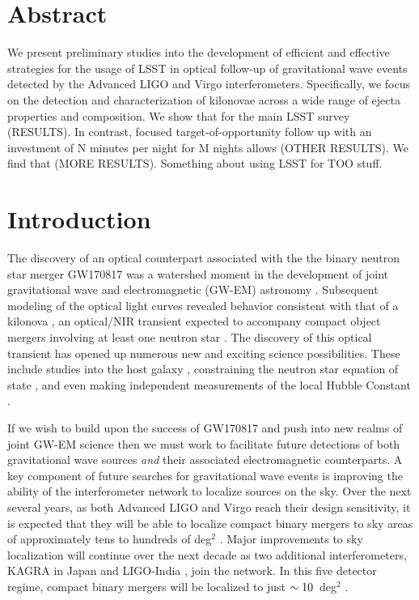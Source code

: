 \section*{Abstract}
We present preliminary studies into the development of efficient and effective strategies for the usage of LSST in optical follow-up of gravitational wave events detected by the Advanced LIGO and Virgo interferometers. Specifically, we focus on the detection and characterization of kilonovae across a wide range of ejecta properties and composition. We show that for the main LSST survey (RESULTS). In contrast, focused target-of-opportunity follow up with an investment of N minutes per night for M nights allows (OTHER RESULTS). We find that (MORE RESULTS). Something about using LSST for TOO stuff.

\clearpage
\section{Introduction}
\label{sec:ch6_intro}
The discovery of an optical counterpart associated with the the binary neutron star merger GW170817 was a watershed moment in the development of joint gravitational wave and electromagnetic (GW-EM) astronomy \citep{LIGOGW170817,LIGOMMAPaper,Arcavi+17,Coulter+17,GW170817DECam,Valenti+17}. Subsequent modeling of the optical light curves revealed behavior consistent with that of a kilonova \citep{Cowp+17,Kilpatrick+17,Tanaka+17,Villar+17b, Tanaka+18}, an optical/NIR transient expected to accompany compact object mergers involving at least one neutron star \citep[for a review see e.g.,][]{Metzger2017}. The discovery of this optical transient has opened up numerous new and exciting science possibilities. These include studies into the host galaxy \citep[NGC4993, see e.g.,][]{Blanchard+17,Cantiello+18}, constraining the neutron star equation of state \citep[see e.g.,][]{Radice+18}, and even making independent measurements of the local Hubble Constant \citep[H$_0$, see e.g.,][]{LIGOH0,Guidorzi+17}.

If we wish to build upon the success of GW170817 and push into new realms of joint GW-EM science then we must work to facilitate future detections of both gravitational wave sources {\em and} their associated electromagnetic counterparts. A key component of future searches for gravitational wave events is improving the ability of the interferometer network to localize sources on the sky. Over the next several years, as both Advanced LIGO and Virgo reach their design sensitivity, it is expected that they will be able to localize compact binary mergers to sky areas of approximately tens to hundreds of deg$^2$ \citep{LIGOLocalization,ChenHolz16}. Major improvements to sky localization will continue over the next decade as two additional interferometers, KAGRA in Japan \citep{KAGRA} and LIGO-India \citep{LIGOIndia}, join the network. In this five detector regime, compact binary mergers will be localized to just $\sim10$~deg$^2$ \citep{Fairhurst2014,ChenHolz16}.

